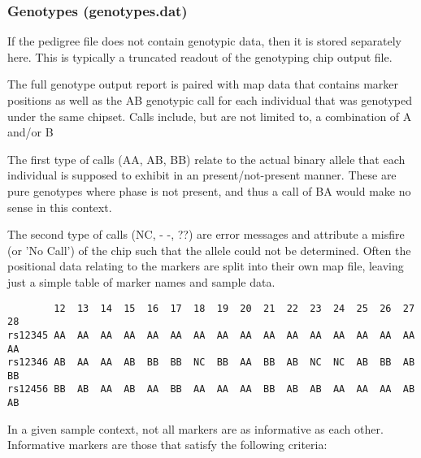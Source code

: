\subsubsection{Genotypes (genotypes.dat)}

If the pedigree file does not contain genotypic data, then it is stored separately here. This is typically a truncated readout of the genotyping chip output file. 

The full genotype output report is paired with map data that contains marker positions as well as the AB genotypic call for each individual that was genotyped under the same chipset. Calls include, but are not limited to, a combination of A and/or B

The first type of calls (AA, AB, BB) relate to the actual binary allele that each individual is supposed to exhibit in an present/not-present manner. These are pure genotypes where phase is not present, and thus a call of BA would make no sense in this context.

The second type of calls (NC, - -, ??) are error messages and attribute a misfire (or 'No Call') of the chip such that the allele could not be determined.
Often the positional data relating to the markers are split into their own map file, leaving just a simple table of marker names and sample data.

\begingroup
\vspace{10pt}
\begin{lstlisting}
		12	13	14	15	16	17	18	19	20	21	22	23	24	25	26	27	28
rs12345	AA	AA	AA	AA	AA	AA	AA	AA	AA	AA	AA	AA	AA	AA	AA	AA	AA
rs12346	AB	AA	AA	AB	BB	BB	NC	BB	AA	BB	AB	NC	NC	AB	BB	AB	BB
rs12456	BB	AB	AA	AB	AA	BB	AA	AA	AA	BB	AB	AB	AA	AA	AA	AB	AB
\end{lstlisting}
\vspace{-10pt}
\endgroup

In a given sample context, not all markers are as informative as each other.  Informative markers are those that satisfy the following criteria:\label{informativemarkers}

